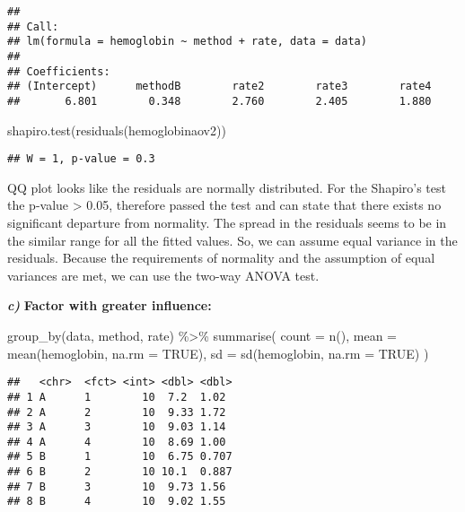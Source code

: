\documentclass[
]{article}
\newenvironment{Shaded}{\begin{snugshade}}{\end{snugshade}}
\newcommand{\AttributeTok}[1]{\textcolor[rgb]{0.77,0.63,0.00}{#1}}
\newcommand{\ConstantTok}[1]{\textcolor[rgb]{0.00,0.00,0.00}{#1}}
\newcommand{\FunctionTok}[1]{\textcolor[rgb]{0.00,0.00,0.00}{#1}}
\newcommand{\NormalTok}[1]{#1}
\newcommand{\SpecialCharTok}[1]{\textcolor[rgb]{0.00,0.00,0.00}{#1}}
\begin{document}
\begin{verbatim}
## 
## Call:
## lm(formula = hemoglobin ~ method + rate, data = data)
## 
## Coefficients:
## (Intercept)      methodB        rate2        rate3        rate4  
##       6.801        0.348        2.760        2.405        1.880
\end{verbatim}

\begin{Shaded}
\begin{Highlighting}[]
\FunctionTok{shapiro.test}\NormalTok{(}\FunctionTok{residuals}\NormalTok{(hemoglobinaov2))}
\end{Highlighting}
\end{Shaded}

\begin{verbatim}
## W = 1, p-value = 0.3
\end{verbatim}

QQ plot looks like the residuals are normally distributed. For the
Shapiro's test the p-value \textgreater{} 0.05, therefore passed the
test and can state that there exists no significant departure from
normality. The spread in the residuals seems to be in the similar range
for all the fitted values. So, we can assume equal variance in the
residuals. Because the requirements of normality and the assumption of
equal variances are met, we can use the two-way ANOVA test.

\textbf{\emph{c)}} \textbf{Factor with greater influence:}

\begin{Shaded}
\begin{Highlighting}[]
\FunctionTok{group\_by}\NormalTok{(data, method, rate) }\SpecialCharTok{\%\textgreater{}\%}
  \FunctionTok{summarise}\NormalTok{(}
    \AttributeTok{count =} \FunctionTok{n}\NormalTok{(),}
    \AttributeTok{mean =} \FunctionTok{mean}\NormalTok{(hemoglobin, }\AttributeTok{na.rm =} \ConstantTok{TRUE}\NormalTok{),}
    \AttributeTok{sd =} \FunctionTok{sd}\NormalTok{(hemoglobin, }\AttributeTok{na.rm =} \ConstantTok{TRUE}\NormalTok{)}
\NormalTok{  )}
\end{Highlighting}
\end{Shaded}

\begin{verbatim}
##   <chr>  <fct> <int> <dbl> <dbl>
## 1 A      1        10  7.2  1.02 
## 2 A      2        10  9.33 1.72 
## 3 A      3        10  9.03 1.14 
## 4 A      4        10  8.69 1.00 
## 5 B      1        10  6.75 0.707
## 6 B      2        10 10.1  0.887
## 7 B      3        10  9.73 1.56 
## 8 B      4        10  9.02 1.55
\end{verbatim}
\end{document}
